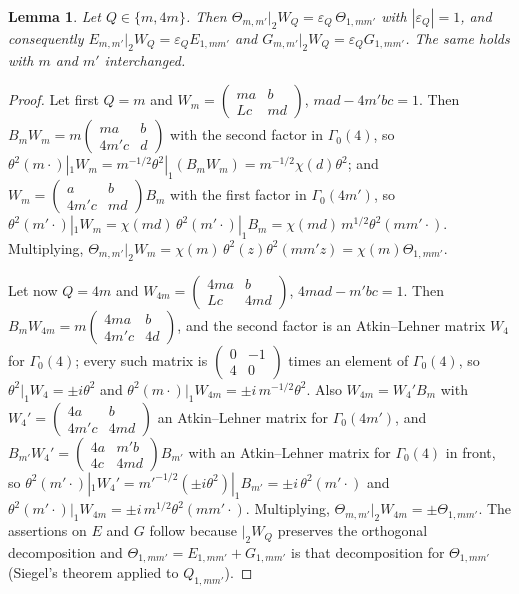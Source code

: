 ﻿\documentclass[11pt]{amsart}
\newtheorem{lemma}[theorem]{Lemma}
\theoremstyle{remark}
\newcommand{\e}{\varepsilon}
\begin{document}
\begin{lemma}\label{lem:AL}
Let $Q\in\{m,4m\}$. Then $\Theta_{m,m'}|_2W_Q=\e_Q\,\Theta_{1,mm'}$ with $|\e_Q|=1$, and consequently $E_{m,m'}|_2W_Q=\e_QE_{1,mm'}$ and $G_{m,m'}|_2W_Q=\e_QG_{1,mm'}$. The same holds with $m$ and $m'$ interchanged.
\end{lemma}
\begin{proof}
Let first $Q=m$ and $W_m=\left(\begin{smallmatrix}ma&b\\Lc&md\end{smallmatrix}\right)$, $mad-4m'bc=1$. Then $B_mW_m=m\left(\begin{smallmatrix}ma&b\\4m'c&d\end{smallmatrix}\right)$ with the second factor in $\Gamma_0(4)$, so $\theta^2(m\cdot)|_1W_m=m^{-1/2}\theta^2|_1(B_mW_m)=m^{-1/2}\chi(d)\theta^2$; and $W_m=\left(\begin{smallmatrix}a&b\\4m'c&md\end{smallmatrix}\right)B_m$ with the first factor in $\Gamma_0(4m')$, so $\theta^2(m'\cdot)|_1W_m=\chi(md)\,\theta^2(m'\cdot)|_1B_m=\chi(md)\,m^{1/2}\theta^2(mm'\cdot)$. Multiplying, $\Theta_{m,m'}|_2W_m=\chi(m)\,\theta^2(z)\theta^2(mm'z)=\chi(m)\Theta_{1,mm'}$.

Let now $Q=4m$ and $W_{4m}=\left(\begin{smallmatrix}4ma&b\\Lc&4md\end{smallmatrix}\right)$, $4mad-m'bc=1$. Then $B_mW_{4m}=m\left(\begin{smallmatrix}4ma&b\\4m'c&4d\end{smallmatrix}\right)$, and the second factor is an Atkin--Lehner matrix $W_4$ for $\Gamma_0(4)$; every such matrix is $\left(\begin{smallmatrix}0&-1\\4&0\end{smallmatrix}\right)$ times an element of $\Gamma_0(4)$, so $\theta^2|_1W_4=\pm i\theta^2$ and $\theta^2(m\cdot)|_1W_{4m}=\pm i\,m^{-1/2}\theta^2$. Also $W_{4m}=W_4'B_m$ with $W_4'=\left(\begin{smallmatrix}4a&b\\4m'c&4md\end{smallmatrix}\right)$ an Atkin--Lehner matrix for $\Gamma_0(4m')$, and $B_{m'}W_4'=\left(\begin{smallmatrix}4a&m'b\\4c&4md\end{smallmatrix}\right)B_{m'}$ with an Atkin--Lehner matrix for $\Gamma_0(4)$ in front, so $\theta^2(m'\cdot)|_1W_4'=m'^{-1/2}(\pm i\theta^2)|_1B_{m'}=\pm i\,\theta^2(m'\cdot)$ and $\theta^2(m'\cdot)|_1W_{4m}=\pm i\,m^{1/2}\theta^2(mm'\cdot)$. Multiplying, $\Theta_{m,m'}|_2W_{4m}=\pm\Theta_{1,mm'}$. The assertions on $E$ and $G$ follow because $|_2W_Q$ preserves the orthogonal decomposition and $\Theta_{1,mm'}=E_{1,mm'}+G_{1,mm'}$ is that decomposition for $\Theta_{1,mm'}$ (Siegel's theorem applied to $Q_{1,mm'}$).
\end{proof}
\end{document}
